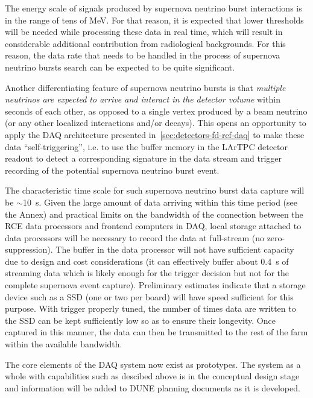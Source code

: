 The energy scale of signals produced by supernova
neutrino burst interactions is in the range of tens of MeV.
For that reason, it is expected that lower thresholds will be needed
while processing these data in real time, which will result in
considerable additional contribution from radiological backgrounds.  For this
reason, the data rate that needs to be handled in the process of
supernova neutrino bursts search can be expected to be quite
significant.

Another differentiating feature of supernova neutrino bursts is that
\textit{multiple neutrinos are expected to arrive and interact in the
  detector volume} within seconds of each other, as opposed to a
single vertex produced by a beam neutrino (or any other localized
interactions and/or decays). This opens an opportunity to apply the
DAQ architecture presented in~\ref{sec:detectors-fd-ref-daq} to make
these data ``self-triggering'', i.e.  to use the buffer memory in the
LArTPC detector readout to detect a corresponding signature in the
data stream and trigger recording of the potential supernova neutrino
burst event.

The characteristic time scale for such supernova neutrino burst data
capture will be $\sim$\SI{10}{\second}.  Given the large amount of
data arriving within this time period (see the Annex) and practical
limits on the bandwidth of the connection between the RCE data
processors and frontend computers in DAQ, local storage attached to
data processors will be necessary to record the data at full-stream
(no zero-suppression).  The buffer in the data processor will not have
sufficient capacity due to design and cost considerations (it can
effectively buffer about \SI{0.4}{\second} of streaming data which is
likely enough for the trigger decision but not for the complete
supernova event capture).  Preliminary estimates indicate that a
storage device such as a SSD (one or two per board) will have speed
sufficient for this purpose.  With trigger properly tuned, the number
of times data are written to the SSD can be kept sufficiently low so
as to ensure their longevity.  Once captured in this manner, the data
can then be transmitted to the rest of the farm within the available
bandwidth.

The core elements of the DAQ system now exist as prototypes.  The
system as a whole with capabilities such as descibed above is in the
conceptual design stage and information will be added to DUNE planning
documents as it is developed.




